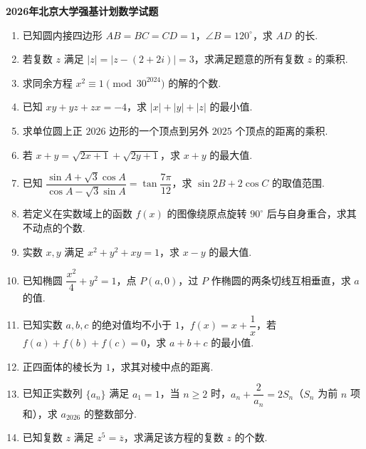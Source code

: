 \documentclass[a4paper,11pt]{report}
\begin{document}
\begin{center}
    {\Large \bfseries 2026年北京大学强基计划数学试题}
\end{center}

\begin{enumerate}
    \item 已知圆内接四边形 $AB=BC=CD=1$，$\angle B=120^\circ$，求 $AD$ 的长. 

    \item 若复数 $z$ 满足 $|z|=|z-(2+2i)|=3$，求满足题意的所有复数 $z$ 的乘积. 

    \item 求同余方程 $x^2\equiv 1\pmod{30^{2024}}$ 的解的个数. 

    \item 已知 $xy+yz+zx=-4$，求 $|x|+|y|+|z|$ 的最小值. 

    \item 求单位圆上正 $2026$ 边形的一个顶点到另外 $2025$ 个顶点的距离的乘积. 

    \item 若 $x+y=\sqrt{2x+1}+\sqrt{2y+1}$，求 $x+y$ 的最大值. 

    \item 已知 $\dfrac{\sin A+\sqrt{3}\cos A}{\cos A-\sqrt{3}\sin A}=\tan\dfrac{7\pi}{12}$，求 $\sin 2B+2\cos C$ 的取值范围. 

    \item 若定义在实数域上的函数 $f(x)$ 的图像绕原点旋转 $90^\circ$ 后与自身重合，求其不动点的个数. 

    \item 实数 $x,y$ 满足 $x^2+y^2+xy=1$，求 $x-y$ 的最大值. 

    \item 已知椭圆 $\dfrac{x^2}{4}+y^2=1$，点 $P(a,0)$，过 $P$ 作椭圆的两条切线互相垂直，求 $a$ 的值. 

    \item 已知实数 $a,b,c$ 的绝对值均不小于 $1$，$f(x)=x+\dfrac{1}{x}$，若 $f(a)+f(b)+f(c)=0$，求 $a+b+c$ 的最小值. 

    \item 正四面体的棱长为 $1$，求其对棱中点的距离. 

    \item 已知正实数列 $\{a_n\}$ 满足 $a_1=1$，当 $n\geq 2$ 时，$a_n+\dfrac{2}{a_n}=2S_n$（$S_n$ 为前 $n$ 项和），求 $a_{2026}$ 的整数部分. 

    \item 已知复数 $z$ 满足 $z^5=\overline{z}$，求满足该方程的复数 $z$ 的个数. 


\end{enumerate}
\end{document}
